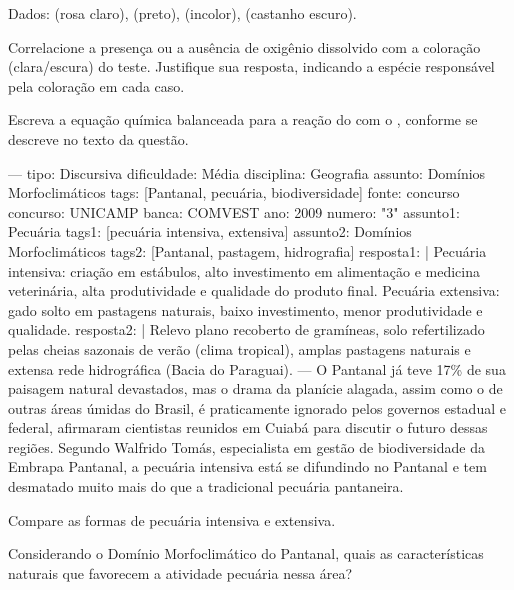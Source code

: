 Dados:  (rosa claro),  (preto),  (incolor),  (castanho escuro).

\questionitem
Correlacione a presença ou a ausência de oxigênio dissolvido com a coloração (clara/escura) do teste. Justifique sua resposta, indicando a espécie responsável pela coloração em cada caso.

\questionitem
Escreva a equação química balanceada para a reação do  com o , conforme se descreve no texto da questão.

\setquestion
---
tipo: Discursiva
dificuldade: Média
disciplina: Geografia
assunto: Domínios Morfoclimáticos
tags: [Pantanal, pecuária, biodiversidade]
fonte: concurso
concurso: UNICAMP
banca: COMVEST
ano: 2009
numero: "3"
assunto1: Pecuária
tags1: [pecuária intensiva, extensiva]
assunto2: Domínios Morfoclimáticos
tags2: [Pantanal, pastagem, hidrografia]
resposta1: |
  Pecuária intensiva: criação em estábulos, alto investimento em alimentação e medicina veterinária,
  alta produtividade e qualidade do produto final.
  Pecuária extensiva: gado solto em pastagens naturais, baixo investimento, menor produtividade e qualidade.
resposta2: |
  Relevo plano recoberto de gramíneas, solo refertilizado pelas cheias sazonais de verão (clima tropical),
  amplas pastagens naturais e extensa rede hidrográfica (Bacia do Paraguai).
---
O Pantanal já teve 17\% de sua paisagem natural devastados, mas o drama da planície alagada, assim como o de outras áreas úmidas do Brasil, é praticamente ignorado pelos governos estadual e federal, afirmaram cientistas reunidos em Cuiabá para discutir o futuro dessas regiões. Segundo Walfrido Tomás, especialista em gestão de biodiversidade da Embrapa Pantanal, a pecuária intensiva está se difundindo no Pantanal e tem desmatado muito mais do que a tradicional pecuária pantaneira.

\questionitem
Compare as formas de pecuária intensiva e extensiva.

\questionitem
Considerando o Domínio Morfoclimático do Pantanal, quais as características naturais que favorecem a atividade pecuária nessa área?

